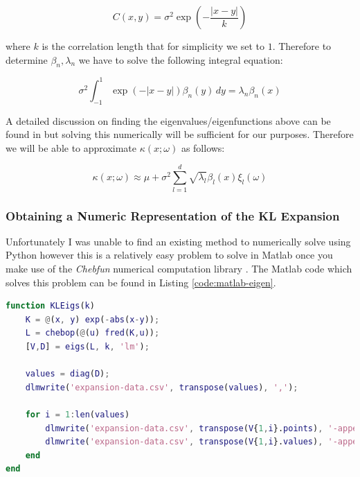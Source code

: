 \begin{equation}
    C(x, y) = \sigma^2\exp\left(-\frac{|x - y|}{k}\right)
\end{equation}

where $k$ is the correlation length that for simplicity we set to $1$.
Therefore to determine $\beta_n, \lambda_n$ we have to solve the following
integral equation:

\begin{equation}\label{eq:oned-stochastic-kle-eigenvalue-problem}
    \sigma^2\int_{-1}^1\exp(-|x - y|)\beta_n(y)\, dy = \lambda_n\beta_n(x)
\end{equation}

A detailed discussion on finding the eigenvalues/eigenfunctions above can be
found in \cite{stochastic-fem} but solving this numerically will be sufficient
for our purposes. Therefore we will be able to approximate $\kappa(x;\omega)$
as follows:

\begin{equation}\label{eq:oned-stochastic-kl-kappa}
    \kappa(x;\omega) \approx
        \mu + \sigma^2\sum_{l=1}^d\sqrt{\lambda_l}\beta_l(x)\xi_l(\omega)
\end{equation}

\subsubsection{Obtaining a Numeric Representation of the KL Expansion}

Unfortunately I was unable to find an existing method to numerically solve
 using Python however this is
a relatively easy problem to solve in Matlab once you make use of the
\textit{Chebfun} numerical computation library \cite{chebfun}. The Matlab code
which solves this problem can be found in Listing \ref{code:matlab-eigen}.

\begin{lstlisting}[caption={Matlab code which finds the first 5 eigenvalues and
                            associated eigenfunctions},
                   label={code:matlab-eigen},
                   language=Matlab]
function KLEigs(k)
    K = @(x, y) exp(-abs(x-y));
    L = chebop(@(u) fred(K,u));
    [V,D] = eigs(L, k, 'lm');

    values = diag(D);
    dlmwrite('expansion-data.csv', transpose(values), ',');

    for i = 1:len(values)
        dlmwrite('expansion-data.csv', transpose(V{1,i}.points), '-append', 'delimiter', ',');
        dlmwrite('expansion-data.csv', transpose(V{1,i}.values), '-append', 'delimiter', ',');
    end
end
\end{lstlisting}

